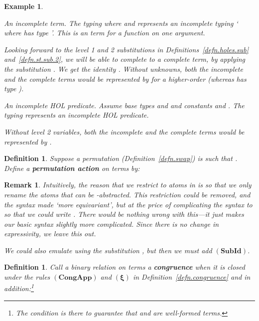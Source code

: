 \documentclass[submission,copyright]{eptcs}
\newtheorem{defn}[thrm]{Definition}
\newtheorem{xmpl}[thrm]{Example}
\newtheorem{rmrk}[thrm]{Remark}
\newcommand{\deffont}[1]{\textbf{#1}}
\newcommand{\rulefont}[1]{\ensuremath{(\mathbf{#1})}}
\begin{document}
\begin{xmpl}
\begin{itemize*}
\item
\emph{An incomplete term.}\quad
The typing  where  and  represents an incomplete typing ` where  has type '. 
This is an term for a function on one argument.

Looking forward to the level 1 and 2 substitutions in Definitions~\ref{defn.holes.sub} and~\ref{defn.st.sub.2}, we will be able to complete  to a complete term, by applying the substitution .
We get the identity .
Without unknowns, both the incomplete and the complete terms would be represented by  for a higher-order  (whereas  has type ).
\item
\emph{An incomplete HOL predicate.}\quad
Assume base types  and  and constants  and .
The typing  represents an incomplete HOL predicate. 

Without level 2 variables, both the incomplete and the complete terms would be represented by .
\end{itemize*} 
\end{xmpl} 

\begin{defn}
\label{defn.perm.action}
Suppose a permutation  (Definition~\ref{defn.swap}) is such that . 
Define a \deffont{permutation action}  on terms by:

\end{defn}

\begin{rmrk}
\label{rmrk.simple}
Intuitively, the reason that we restrict  to atoms in  is so that we only rename the atoms that can be -abstracted.
This restriction could be removed, and the syntax made `more equivariant', but at the price of complicating the syntax  to  so that we could write .
There would be nothing wrong with this---it just makes our basic syntax slightly more complicated.
Since there is no change in expressivity, we leave this out.

We could also emulate  using the substitution , but then we must add \rulefont{SubId}.
\end{rmrk}

\begin{defn}
\label{defn.holes.congruence}
Call a binary relation  on terms a \deffont{congruence} when it is closed under the rules \rulefont{CongApp} and \rulefont{\xi} in Definition~\ref{defn.congruence} and in addition:\footnote{The condition  is there to guarantee that  and  are well-formed terms.}

\end{defn}
\end{document}
